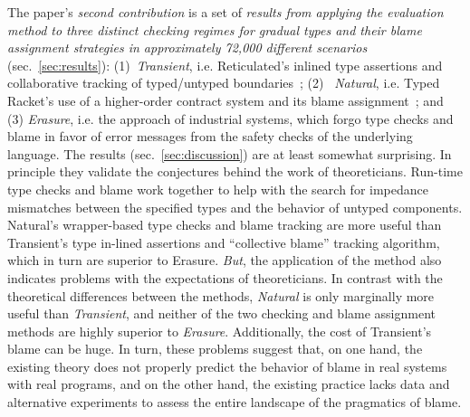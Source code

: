 The paper's {\it second contribution\/} is a set of {\em results from
applying the evaluation method to three distinct checking regimes for
gradual types and their blame assignment
strategies in approximately 72,000 different scenarios\/}
(sec.~\ref{sec:results}): (1)~{\it Transient\/}, i.e. Reticulated's
inlined type assertions and collaborative tracking of typed/untyped boundaries~\citep{vss-popl-2017}; (2)~{\it
Natural\/}, i.e. Typed Racket's use of a higher-order contract system and
its blame assignment~\citep{ff-icfp-2002}; and (3) {\it Erasure\/}, i.e.
the approach of industrial systems, which forgo type checks and blame in favor of error
messages from the safety checks of the underlying language. The results
(sec.~\ref{sec:discussion}) are at least somewhat surprising.  In
principle they validate the conjectures behind the work of theoreticians.
Run-time type checks and blame work together to help with the search for
impedance mismatches between the specified types and the behavior of
untyped components.  Natural's wrapper-based type checks and blame tracking are
more useful than Transient's type in-lined assertions and ``collective blame'' tracking algorithm,
which in turn are superior to Erasure. {\em But\/}, the application of the
method also indicates problems with the expectations of theoreticians. 
In contrast with the theoretical differences between the methods,
{\it Natural\/} is only marginally more useful than {\it Transient\/}, and neither of the two
checking and blame assignment methods are highly superior to {\it Erasure\/}. Additionally, 
the cost of Transient's blame can be huge.  In turn, these
problems suggest that, on one hand, the existing theory does not properly
predict the behavior of blame in real systems with real programs,
and on the other hand, the existing practice lacks data and alternative
experiments to assess the entire landscape of the pragmatics of blame. 
